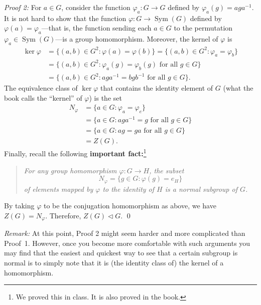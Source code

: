 \documentclass[12pt,reqno]{amsart}
\newcommand{\<}{\ensuremath{\langle}}
\renewcommand{\>}{\ensuremath{\rangle}}
\newcommand{\Sym}{\ensuremath{\operatorname{Sym}}}
\begin{document}
\begin{enumerate}
\begin{enumerate}
\medskip

\noindent
\emph{Proof 2:}
For $a \in G$, consider the function 
$\varphi_a : G \rightarrow G$ defined by
$\varphi_a(g) =aga^{-1}$.
It is not hard to show that the function
$\varphi : G \rightarrow \Sym(G)$ defined by $\varphi(a) = \varphi_a$---that is,
the function sending each $a\in G$ to the permutation $\varphi_a\in
\Sym(G)$---is a group homomorphism.   
Moreover, the kernel of $\varphi$ is
\begin{align*}
\ker \varphi &= \{(a, b) \in G^2 : \varphi(a) = \varphi(b)\}
= \{(a, b) \in G^2 : \varphi_a = \varphi_b\}\\
&= \{(a, b) \in G^2 : \varphi_a(g)= \varphi_b(g) \text{ for all } g \in G\}\\
&= \{(a, b) \in G^2 : aga^{-1}= bgb^{-1} \text{ for all } g \in G\}.
\end{align*}
The equivalence class of $\ker \varphi$ that contains the identity element of
$G$ (what the book calls the ``kernel'' of $\varphi$) is the set
\begin{align*}
N_\varphi %
&= \{ a \in G : \varphi_a = \varphi_e\}\\
&= \{ a \in G : aga^{-1} = g \text{ for all } g\in G\}\\
&= \{ a \in G : ag = ga \text{ for all } g\in G\}\\
&= Z(G).
\end{align*}
Finally, recall the following {\bf important fact:}\footnote{We proved this in class. It is also proved in the book.} 
\medskip
\begin{quote}
  \emph{For any group homomorphism $\varphi: G \rightarrow H$, the subset
    \[
    N_\varphi = \{g \in G : \varphi(g) = e_H\}
    \]
    of elements mapped by $\varphi$ to the identity of $H$ is a normal subgroup of $G$.}
\end{quote}
\medskip
By taking $\varphi$ to be the conjugation homomorphism as above, we have
$Z(G) = N_\varphi$.  Therefore, $Z(G) \triangleleft G$.
\qed

\medskip

\emph{Remark:} At this point, Proof 2 might seem harder and more complicated
than Proof~1.  However, once you become more comfortable with such arguments
you may find that the easiest and quickest way to see that a certain subgroup is
normal is to simply note that it is (the identity class of) the kernel of a homomorphism.

\bigskip


\end{enumerate}
\end{enumerate}
\end{document}
